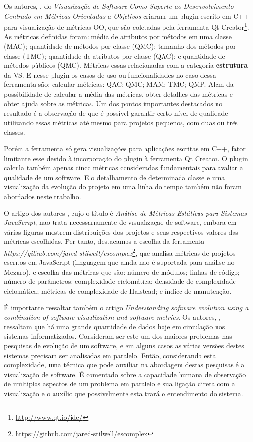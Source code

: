 Os autores, , do \textit{Visualização de Software
Como Suporte ao Desenvolvimento Centrado em Métricas Orientadas a Objetivos}
criaram um plugin escrito em C++ para visualização de métricas OO, que são
coletadas pela ferramenta Qt Creator\footnote{\url{http://www.qt.io/ide/}}. As
métricas definidas foram: média de atributos por métodos em uma classe (MAC);
quantidade de métodos por classe (QMC); tamanho dos métodos por classe (TMC);
quantidade de atributos por classe (QAC); e quantidade de métodos públicos
(QMC). Métricas essas relacionadas com a categoria \textbf{estrutura} da VS.
E nesse plugin os casos de uso ou funcionalidades no caso dessa
ferramenta são: calcular métricas: QAC; QMC; MAM; TMC; QMP. Além da
possibilidade de calcular a média das métricas, obter detalhes das métricas e
obter ajuda sobre as métricas. Um dos pontos importantes destacados no
resultado é a observação de que é possível garantir certo nível de qualidade
utilizando essas métricas até mesmo para projetos pequenos, com duas ou três
classes.

Porém a ferramenta só gera visualizações para aplicações escritas em C++, fator
limitante esse devido à incorporação do plugin à ferramenta Qt Creator. O
plugin calcula também apenas cinco métricas consideradas fundamentais para
avaliar a qualidade de um software. E o detalhamento de determinada classe e
uma visualização da evolução do projeto em uma linha do tempo também não foram
abordados neste trabalho.

O artigo dos autores , cujo o título é \textit{Análise de
Métricas Estáticas para Sistemas JavaScript}, não trata necessariamente de
visualização de software, embora em várias figuras mostrem distribuições dos
projetos e seus respectivos valores das métricas escolhidas. Por tanto,
destacamos a escolha da ferramenta
\textit{https://github.com/jared-stilwell/escomplex}\footnote{\url{https://github.com/jared-stilwell/escomplex}},
que analisa métricas de projetos escritos em JavaScript (linguagem que ainda
não é suportada para análise no Mezuro), e escolha das métricas que são: número
de módulos; linhas de código; número de parâmetros; complexidade ciclomática;
densidade de complexidade ciclomática; métricas de complexidade de Halstead; e
índice de manutenção.

É importante ressaltar também o artigo \textit{Understanding software evolution
using a combination of software visualization and software metrics}. Os
autores, , ressaltam que há uma grande
quantidade de dados hoje em circulação nos sistemas informatizados. Consideram ser este um
dos maiores problemas nas pesquisas de evolução de um software, e em alguns
casos as várias versões destes sistemas precisam ser analisadas em paralelo.
Então, considerando esta complexidade, uma técnica que pode auxiliar na
abordagem destas pesquisas é a visualização de software. É comentado sobre a
capacidade humana de observação de múltiplos aspectos de um problema em
paralelo e sua ligação direta com a visualização e o auxílio que possivelmente
esta trará o entendimento do sistema.

